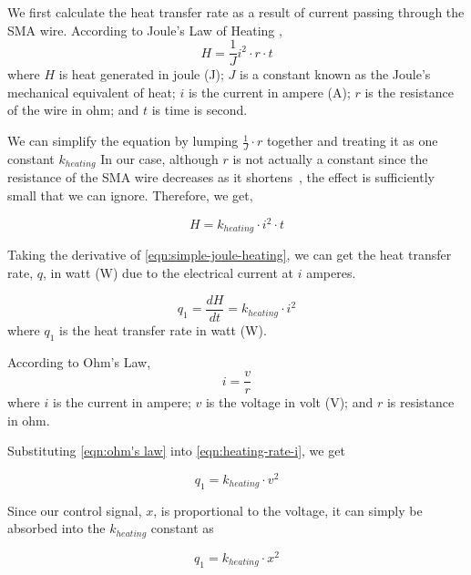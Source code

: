 We first calculate the heat transfer rate as a result of current passing through the SMA wire. According to Joule's Law of Heating \cite{JouleHeating},
\begin{equation}
	H = \frac{1}{J}i^2 \cdot r \cdot t
\end{equation}
where $H$ is heat generated in joule (J); $J$ is a constant known as the Joule's mechanical equivalent of heat; $i$ is the current in ampere (A); $r$ is the resistance of the wire in ohm; and $t$ is time is second.

We can simplify the equation by lumping $\frac{1}{J}\cdot r$ together and treating it as one constant $k_{heating}$
In our case, although $r$ is not actually a constant since the resistance of the SMA wire decreases as it shortens~\cite{FlexinolTechSpecs}, the effect is sufficiently small that we can ignore. Therefore, we get,

\begin{equation}\label{eqn:simple-joule-heating}
H = k_{heating} \cdot i^2 \cdot t
\end{equation}

Taking the derivative of \eqref{eqn:simple-joule-heating}, we can get the heat transfer rate, $q$, in watt (W) due to the electrical current at $i$ amperes. 

\begin{equation}\label{eqn:heating-rate-i}
	q_1 = \frac{dH}{dt} = k_{heating} \cdot i^2
\end{equation}
where $q_1$ is the heat transfer rate in watt (W).

According to Ohm's Law, 
\begin{equation}\label{eqn:ohm's law}
	i = \frac{v}{r}
\end{equation}
where $i$ is the current in ampere; $v$ is the voltage in volt (V); and $r$ is resistance in ohm.

Substituting \eqref{eqn:ohm's law} into \eqref{eqn:heating-rate-i}, we get

\begin{equation}\label{eqn:heating-rate-v}
q_1 = k_{heating} \cdot v^2
\end{equation}

Since our control signal, $x$, is proportional to the voltage, it can simply be absorbed into the $k_{heating}$ constant as 

\begin{equation}\label{eqn:heating-rate-x}
q_1 = k_{heating} \cdot x^2
\end{equation}

